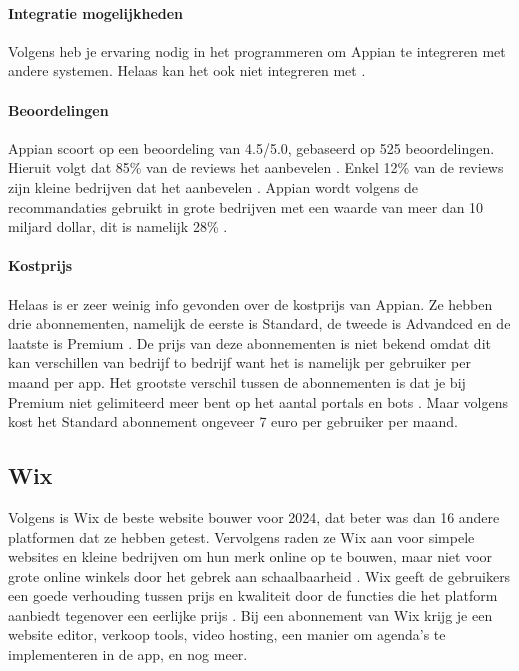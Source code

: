 \paragraph{Integratie mogelijkheden}
Volgens \textcite{Marvin2017} heb je ervaring nodig in het programmeren om Appian te integreren met andere systemen. 
Helaas kan het ook niet integreren met \textcite{MAKE.com2024a}.

\paragraph{Beoordelingen}
Appian scoort op \textcite{Gartner2024} een beoordeling van 4.5/5.0, gebaseerd op 525 beoordelingen. Hieruit volgt dat 85\% van de reviews het aanbevelen \autocite{Gartner2024}.
Enkel 12\% van de reviews zijn kleine bedrijven dat het aanbevelen \autocite{Gartner2024}. Appian wordt volgens de recommandaties gebruikt in grote bedrijven met een waarde van meer dan 10 miljard dollar, dit is namelijk 28\% \autocite{Gartner2024}.
\paragraph{Kostprijs}
Helaas is er zeer weinig info gevonden over de kostprijs van Appian. Ze hebben drie abonnementen, namelijk de eerste is 
Standard, de tweede is Advandced en de laatste is Premium \autocite{Appian2024}. De prijs van deze abonnementen is niet bekend omdat dit kan verschillen van bedrijf to bedrijf want het is namelijk 
per gebruiker per maand per app. Het grootste verschil tussen de abonnementen is dat je bij Premium niet gelimiteerd meer bent op het aantal portals en bots \autocite{Appian2024}. Maar volgens
\textcite{Shala} kost het Standard abonnement ongeveer 7 euro per gebruiker per maand.


\subsection{Wix}%
\label{subsec:wix}
Volgens \textcite{Ryan2024} is Wix de beste website bouwer voor 2024, dat beter was dan 16 andere platformen dat ze hebben getest. Vervolgens raden ze 
Wix aan voor simpele websites en kleine bedrijven om hun merk online op te bouwen, maar niet voor grote online winkels door het gebrek aan schaalbaarheid \autocite{Ryan2024}.
Wix geeft de gebruikers een goede verhouding tussen prijs en kwaliteit door de functies die het platform aanbiedt tegenover een eerlijke prijs  \autocite{Singleton2024}.
Bij een abonnement van Wix krijg je een website editor, verkoop tools, video hosting, een manier om agenda's te implementeren in de app, en nog meer.
